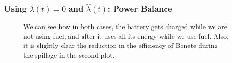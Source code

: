 \documentclass[aspectratio=169]{beamer}\usepackage[utf8]{inputenc}
\begin{document}
\begin{frame}\frametitle{Using $\lambda(t)=0$ and $\hat{\lambda}(t)$: Power Balance}
\begin{figure}[ht!]
\centering
{}
\caption{We can see how in both cases, the battery gets charged while we are not using fuel, and after it uses all its energy while we use fuel. Also, it is slightly clear the reduction in the efficiency of Bonete during the spillage in the second plot.}
\end{figure}
\end{frame}

\begin{frame}
\begin{figure}[ht!]
\centering
{}
\end{figure}
\end{frame}
\end{document}
